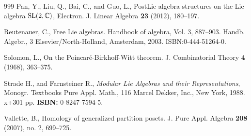 \documentclass[12pt]{article}
\begin{document}
\begin{thebibliography}{999}
 Pan, Y., Liu, Q., Bai, C., and Guo, L.,
PostLie algebra structures on the Lie algebra ${\rm SL}(2,\Bbb C)$,
Electron. J. Linear Algebra \textbf{23} (2012), 180--197.


Reutenauer, C.,
Free Lie algebras. Handbook of algebra, Vol. 3, 887–903.
Handb. Algebr., 3
Elsevier/North-Holland, Amsterdam, 2003.
ISBN:0-444-51264-0.

 Solomon, L.,
On the Poincaré-Birkhoff-Witt theorem.
J. Combinatorial Theory \textbf{4} (1968), 363--375.


 Strade H., and Farnsteiner R.,
 \emph{Modular Lie Algebras and their Representations}, Monogr. Textbooks Pure Appl. Math., 116
Marcel Dekker, Inc., New York, 1988. x+301 pp.
\textbf{ISBN:} 0-8247-7594-5.

 Vallette, B.,
Homology of generalized partition posets.
J. Pure Appl. Algebra   \textbf{208} (2007), no. 2, 699--725.

\end{thebibliography}
\end{document}
